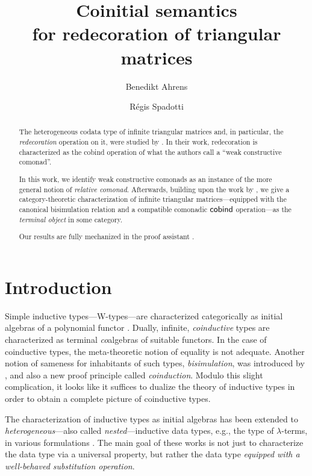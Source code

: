 \documentclass{amsart}
\author{Benedikt Ahrens}
\author{R\'egis Spadotti}
\title[Coinitial semantics for redecoration of triangular matrices]{Coinitial semantics \\ for redecoration of triangular matrices}
\begin{document}
\begin{abstract}
  The heterogeneous codata type of infinite triangular matrices and, in particular, the \emph{redecoration} operation on it, 
  were studied by \citeauthor{DBLP:conf/types/MatthesP11}. In their work,  redecoration is characterized
  as the cobind operation of what the authors call a \enquote{weak constructive comonad}.
  
  In this work, we identify weak constructive comonads as an instance of the more general notion of 
  \emph{relative comonad}.
  Afterwards, building upon the work by \citeauthor{DBLP:conf/types/MatthesP11}, we give a category-theoretic
  characterization of infinite triangular matrices---equipped with the canonical bisimulation relation and a 
  compatible comonadic $\mathsf{cobind}$ operation---as the \emph{terminal object}
  in some category.
  
  Our results are fully mechanized in the proof assistant \coq.
  \end{abstract}

\maketitle


\section{Introduction}

 Simple inductive types---\textsf{W}-types---are characterized categorically as initial algebras of
 a polynomial functor \parencite{DBLP:journals/apal/MoerdijkP00}.
 Dually, infinite, \emph{coinductive} types are characterized as terminal \emph{co}algebras of suitable functors.
 In the case of coinductive types, the meta-theoretic notion of equality is not adequate. Another notion of sameness for inhabitants of such types, 
 \emph{bisimulation}, was introduced by \textcite{aczel_nonwellfounded}, and also
 a new proof principle called \emph{coinduction}. 
 Modulo this slight complication, it looks like it suffices to dualize the theory of inductive types in order to obtain
 a complete picture of coinductive types.

 
 The characterization of inductive types as initial algebras 
 has been extended to \emph{heterogeneous}---also called \emph{nested}---inductive data types, e.g., the type of $\lambda$-terms,
 in various formulations \parencite{fpt, DBLP:journals/iandc/HirschowitzM10}.
 The main goal of these works is not just to characterize the data type via a universal property, but rather the data type
 \emph{equipped with a well-behaved substitution operation}.
 
\end{document}
